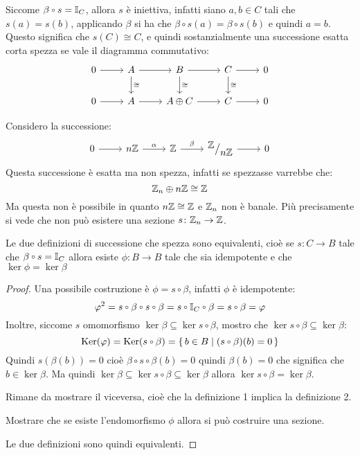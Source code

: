\begin{osservation}
  Siccome $ \beta \circ s = \Id{C} $, allora $ s $ è iniettiva, infatti siano
  $ a, b \in C $ tali che $ s(a) = s(b) $, applicando $ \beta $ si ha che
  $ \beta \circ s (a) = \beta \circ s (b) $ e quindi $ a = b $. Questo significa che
  $ s(C) \cong C $, e quindi sostanzialmente una successione esatta corta spezza se
  vale il diagramma commutativo:
  \[
    \begin{tikzcd}
      0  \rar & A \rar \dar{\cong} & B \rar  \dar{\cong} & C \rar \dar{\cong} & 0 \\
      0 \rar & A \rar &  A \oplus C \rar & C \rar & 0
    \end{tikzcd}
  \]
\end{osservation}

\begin{example}
  Considero la successione:
  \[
    \begin{tikzcd}
      0 \arrow{r}{} & n \Z \arrow{r}{\alpha} & \Z \arrow{r}{\beta} & \quot{\Z}{n\Z} \arrow{r}{} & 0
    \end{tikzcd}
  \]
  Questa successione è esatta ma non spezza, infatti se spezzasse varrebbe che:
  \[
    \mathbb{Z}_n \oplus n \mathbb{Z} \cong \mathbb{Z}
  \]
  Ma questa non è possibile in quanto $ n \mathbb{Z} \cong \mathbb{Z} $ e $ \mathbb{Z}_n $ non è banale. Più
  precisamente si vede che non può esistere una sezione $ s \colon \mathbb{Z}_n \to \mathbb{Z} $.
\end{example}

\begin{proposition}
  Le due definizioni di successione che spezza sono equivalenti, cioè se
  $ s \colon C \to B $ tale che $ \beta \circ s = \Id{C} $ allora esiste
  $ \phi \colon B \to B $ tale che sia idempotente e che $ \ker{\phi} = \ker{\beta} $
\end{proposition}
\begin{proof}
  Una possibile costruzione è $ \phi = s \circ \beta  $, infatti $ \phi $ è idempotente:
  \[
    \phi^2 = s \circ \beta \circ s \circ \beta = s \circ \Id{C} \circ \beta = s \circ \beta = \phi
  \]
  Inoltre, siccome $ s $ omomorfismo $ \ker{\beta} \subseteq \ker{s \circ \beta } $,
  mostro che $ \ker{s \circ \beta} \subseteq \ker{\beta} $:
  \[
    \ker{\phi} = \ker{s \circ \beta} = \set{ b \in B | (s \circ \beta)(b) = 0}
  \]
  Quindi $ s(\beta(b)) = 0 $ cioè $  \beta \circ s \circ \beta (b) = 0 $ quindi $ \beta(b) = 0 $ che significa
  che $ b \in \ker{\beta} $. Ma quindi $ \ker{\beta} \subseteq \ker{s \circ \beta} \subseteq \ker{\beta} $ allora $ \ker{s \circ \beta} = \ker{\beta} $.

  Rimane da mostrare il viceversa, cioè che la definizione 1 implica la definizione 2.
  \begin{exercise}
    Mostrare che se esiste l'endomorfismo $ \phi $ allora si può costruire una sezione.
  \end{exercise}
  Le due definizioni sono quindi equivalenti.
\end{proof}

